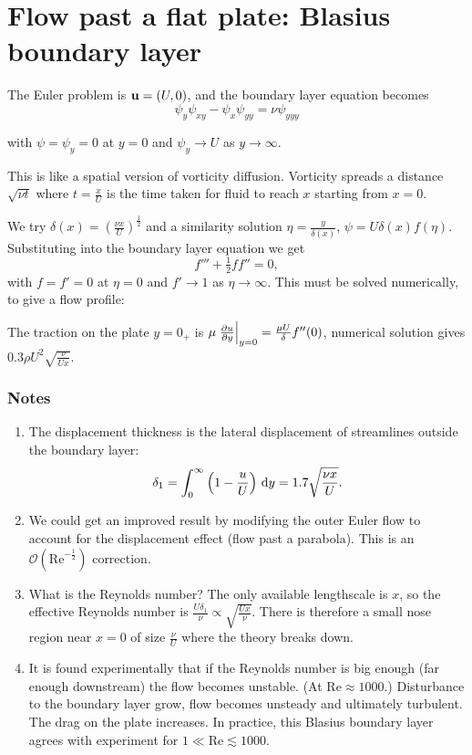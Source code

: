 \documentclass{notes}
\newcommand{\cO}{\mathcal{O}}
\newcommand{\Rey}{\mathrm{Re}}
\theoremstyle{plain}
\begin{document}
\section[Blasius boundary layer]{Flow past a flat plate: Blasius boundary
layer}

\vspace{1in}

The Euler problem is $\mathbf{u} = (U,0)$, and the boundary layer equation becomes
\[
\psi_y \psi_{x y} - \psi_x \psi_{y y} = \nu \psi_{y y y}
\]

with $\psi = \psi_y = 0$ at $y = 0$ and $\psi_y \to U$ as $y \to \infty$.

This is like a spatial version of vorticity diffusion.  Vorticity spreads
a distance $\sqrt{\nu t}$ where $t = \frac{x}{U}$ is the time taken for fluid
to reach $x$ starting from $x = 0$.

We try $\delta(x) = \left( \frac{\nu x}{U} \right)^{\frac{1}{2}}$ and
a similarity solution $\eta = \frac{y}{\delta(x)}$,
$\psi = U \delta(x) f(\eta)$.  Substituting into the boundary
layer equation we get
\[
f''' + \tfrac{1}{2} f f'' = 0,
\]
with $f = f' = 0$ at $\eta =0$ and $f' \to 1$ as $\eta \to \infty$. This
must be solved numerically, to give a flow profile:

\vspace{1.5in}

The traction on the plate $y = 0_+$ is $\mu \left. \frac{\partial u}{\partial y} \right|_{y = 0}
= \frac{\mu U}{\delta} f''(0)$, numerical solution gives
$0.3 \rho U^2 \sqrt{\frac{\nu}{U x}}$.

\subsubsection*{Notes}

\begin{enumerate}
\item The displacement thickness is the lateral displacement of streamlines
outside the boundary layer:
\[
\delta_1 = \int_0^\infty \left( 1 - \frac{u}{U}\right)\, \mathrm{d} y
= 1.7 \sqrt{\frac{\nu x}{U}}.
\]
\item We could get an improved result by modifying the outer Euler flow
to account for the displacement effect (flow past a parabola).  This
is an $\cO(\Rey^{-\frac{1}{2}})$ correction.

\item What is the Reynolds number?  The only available lengthscale is $x$,
so the effective Reynolds number is $\frac{U \delta_1}{\nu}
\propto \sqrt{\frac{U x}{\nu}}$.  There is therefore a small nose region
near $x=0$ of size $\frac{\nu}{U}$ where the theory breaks down.

\item It is found experimentally that if the Reynolds number is big enough
(far enough downstream) the flow becomes unstable.  (At $\Rey \approx 1000$.)
Disturbance to the boundary layer grow, flow becomes unsteady and
ultimately turbulent.  The drag on the plate increases.  In practice,
this Blasius boundary layer agrees with experiment for
$1 \ll \Rey \lesssim 1000$.
\end{enumerate}
\end{document}
